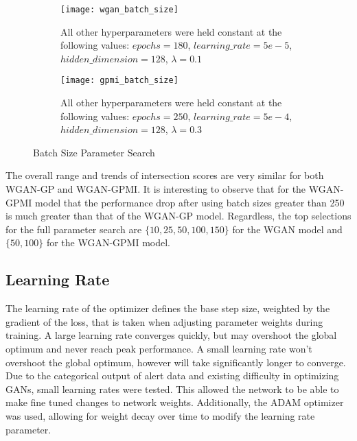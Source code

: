 \begin{figure}[!htbp]
	\centering
	\begin{subfigure}{.7\textwidth}
		\texttt{[image: wgan\_batch\_size]}
	\end{subfigure}%
	\begin{subfigure}{.3\textwidth}
		\caption{
			All other hyperparameters were held constant at the following values: $epochs=180$, $learning\_rate=5e-5$, $hidden\_dimension=128$, $\lambda=0.1$
		}
		\label{fig:wgan_batch_size}
	\end{subfigure}%

	\begin{subfigure}{.7\textwidth}
		\texttt{[image: gpmi\_batch\_size]}
	\end{subfigure}%
	\begin{subfigure}{.3\textwidth}
		\caption{
			All other hyperparameters were held constant at the following values: $epochs=250$, $learning\_rate=5e-4$, $hidden\_dimension=128$, $\lambda=0.3$
		}
		\label{fig:gpmi_batch_size}
	\end{subfigure}%
	\caption{Batch Size Parameter Search}
\end{figure}

The overall range and trends of intersection scores are very similar for both WGAN-GP and WGAN-GPMI. It is interesting to observe that for the WGAN-GPMI model that the performance drop after using batch sizes greater than 250 is much greater than that of the WGAN-GP model. Regardless, the top selections for the full parameter search are $\{10,25,50,100,150\}$ for the WGAN model and $\{50,100\}$ for the WGAN-GPMI model.

\subsection{Learning Rate}
\label{sec:lr}

The learning rate of the optimizer defines the base step size, weighted by the gradient of the loss, that is taken when adjusting parameter weights during training. A large learning rate converges quickly, but may overshoot the global optimum and never reach peak performance. A small learning rate won't overshoot the global optimum, however will take significantly longer to converge. Due to the categorical output of alert data and existing difficulty in optimizing GANs, small learning rates were tested. This allowed the network to be able to make fine tuned changes to network weights. Additionally, the ADAM optimizer was used, allowing for weight decay over time to modify the learning rate parameter.


